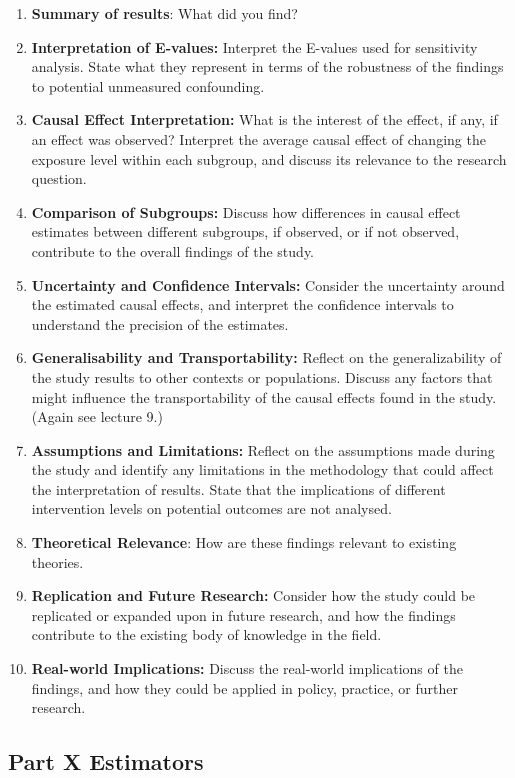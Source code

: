 \documentclass[
  singlecolumn]{article}
\begin{document}
\begin{enumerate}
\def\labelenumi{\arabic{enumi}.}
\item
  \textbf{Summary of results}: What did you find?
\item
  \textbf{Interpretation of E-values:} Interpret the E-values used for
  sensitivity analysis. State what they represent in terms of the
  robustness of the findings to potential unmeasured confounding.
\item
  \textbf{Causal Effect Interpretation:} What is the interest of the
  effect, if any, if an effect was observed? Interpret the average
  causal effect of changing the exposure level within each subgroup, and
  discuss its relevance to the research question.
\item
  \textbf{Comparison of Subgroups:} Discuss how differences in causal
  effect estimates between different subgroups, if observed, or if not
  observed, contribute to the overall findings of the study.
\item
  \textbf{Uncertainty and Confidence Intervals:} Consider the
  uncertainty around the estimated causal effects, and interpret the
  confidence intervals to understand the precision of the estimates.
\item
  \textbf{Generalisability and Transportability:} Reflect on the
  generalizability of the study results to other contexts or
  populations. Discuss any factors that might influence the
  transportability of the causal effects found in the study. (Again see
  lecture 9.)
\item
  \textbf{Assumptions and Limitations:} Reflect on the assumptions made
  during the study and identify any limitations in the methodology that
  could affect the interpretation of results. State that the
  implications of different intervention levels on potential outcomes
  are not analysed.
\item
  \textbf{Theoretical Relevance}: How are these findings relevant to
  existing theories.
\item
  \textbf{Replication and Future Research:} Consider how the study could
  be replicated or expanded upon in future research, and how the
  findings contribute to the existing body of knowledge in the field.
\item
  \textbf{Real-world Implications:} Discuss the real-world implications
  of the findings, and how they could be applied in policy, practice, or
  further research.
\end{enumerate}

\subsection{Part X Estimators}\label{part-x-estimators}
\end{document}
